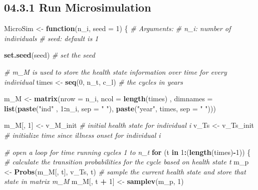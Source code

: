\documentclass[
]{article}
\newenvironment{Shaded}{\begin{snugshade}}{\end{snugshade}}
\newcommand{\CommentTok}[1]{\textcolor[rgb]{0.56,0.35,0.01}{\textit{#1}}}
\newcommand{\ControlFlowTok}[1]{\textcolor[rgb]{0.13,0.29,0.53}{\textbf{#1}}}
\newcommand{\DataTypeTok}[1]{\textcolor[rgb]{0.13,0.29,0.53}{#1}}
\newcommand{\DecValTok}[1]{\textcolor[rgb]{0.00,0.00,0.81}{#1}}
\newcommand{\KeywordTok}[1]{\textcolor[rgb]{0.13,0.29,0.53}{\textbf{#1}}}
\newcommand{\NormalTok}[1]{#1}
\newcommand{\OperatorTok}[1]{\textcolor[rgb]{0.81,0.36,0.00}{\textbf{#1}}}
\newcommand{\StringTok}[1]{\textcolor[rgb]{0.31,0.60,0.02}{#1}}
\begin{document}
\hypertarget{run-microsimulation}{%
\subsection{04.3.1 Run Microsimulation}\label{run-microsimulation}}

\begin{Shaded}
\begin{Highlighting}[]
\NormalTok{MicroSim <-}\StringTok{ }\ControlFlowTok{function}\NormalTok{(n_i,  }\DataTypeTok{seed =} \DecValTok{1}\NormalTok{) \{}
  \CommentTok{# Arguments:  }
  \CommentTok{# n_i:     number of individuals}
  \CommentTok{# seed:    default is 1}
  
  \KeywordTok{set.seed}\NormalTok{(seed) }\CommentTok{# set the seed}
  
  \CommentTok{# m_M is used to store the health state information over time for every individual}
\NormalTok{  times     <-}\StringTok{ }\KeywordTok{seq}\NormalTok{(}\DecValTok{0}\NormalTok{, n_t, c_l)  }\CommentTok{# the cycles in years}
  
\NormalTok{  m_M  <-}\StringTok{  }\KeywordTok{matrix}\NormalTok{(}\DataTypeTok{nrow =}\NormalTok{ n_i, }\DataTypeTok{ncol =} \KeywordTok{length}\NormalTok{(times) , }
                  \DataTypeTok{dimnames =} \KeywordTok{list}\NormalTok{(}\KeywordTok{paste}\NormalTok{(}\StringTok{"ind"}\NormalTok{ , }\DecValTok{1}\OperatorTok{:}\NormalTok{n_i, }\DataTypeTok{sep =} \StringTok{" "}\NormalTok{), }
                                  \KeywordTok{paste}\NormalTok{(}\StringTok{"year"}\NormalTok{, times, }\DataTypeTok{sep =} \StringTok{" "}\NormalTok{)))  }

\NormalTok{  m_M[, }\DecValTok{1}\NormalTok{] <-}\StringTok{ }\NormalTok{v_M_init           }\CommentTok{# initial health state for individual i}
\NormalTok{  v_Ts     <-}\StringTok{ }\NormalTok{v_Ts_init          }\CommentTok{# initialize time since illness onset for individual i}
  
  \CommentTok{# open a loop for time running cycles 1 to n_t }
  \ControlFlowTok{for}\NormalTok{ (t }\ControlFlowTok{in} \DecValTok{1}\OperatorTok{:}\NormalTok{(}\KeywordTok{length}\NormalTok{(times)}\OperatorTok{-}\DecValTok{1}\NormalTok{)) \{}
    \CommentTok{# calculate the transition probabilities for the cycle based on health state t}
\NormalTok{    m_p <-}\StringTok{ }\KeywordTok{Probs}\NormalTok{(m_M[, t], v_Ts, t)  }
    \CommentTok{# sample the current health state and store that state in matrix m_M }
\NormalTok{    m_M[, t }\OperatorTok{+}\StringTok{ }\DecValTok{1}\NormalTok{]  <-}\StringTok{ }\KeywordTok{samplev}\NormalTok{(m_p, }\DecValTok{1}\NormalTok{) }
    

\end{Highlighting}
\end{Shaded}
\end{document}
